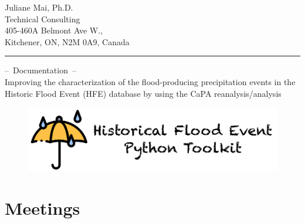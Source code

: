 \documentclass[10pt,a4paper,titlepage,parskip]{scrartcl}
\begin{document}
  
	
	\vspace*{-1cm}
	\pagestyle{fancy}
	
	\begin{center}
		Juliane Mai, Ph.D.\\
		Technical Consulting\\[4pt]
		405-460A Belmont Ave W., \\
		Kitchener, ON, N2M 0A9, Canada\\[10pt]
		{\rule{\linewidth}{0.4pt}}
	\end{center}
	\begin{center}
		\textcolor{myBlue}{{\Large --~Documentation~--}}\\[4pt]
		Improving the characterization of the flood-producing precipitation events in the Historic Flood Event (HFE) database by using the CaPA reanalysis/analysis\\[4pt]
	\end{center}

\vspace*{1cm}
\begin{figure}[h]
	\centering
	\includegraphics[width=0.85\linewidth]{logo/HFE_logo.png}
\end{figure}
\vspace*{1cm}
	
\tableofcontents
\pagebreak

\section{Meetings}
\end{document}
